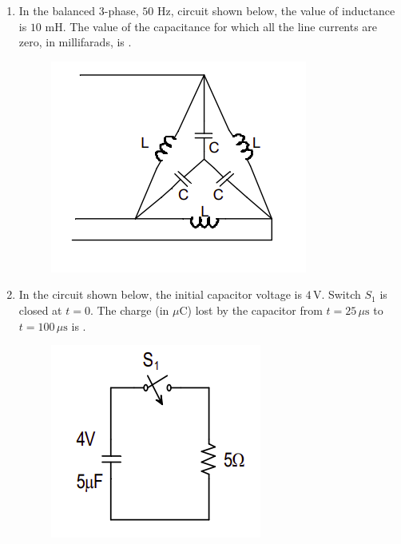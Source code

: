\documentclass[journal,12pt,onecolumn]{IEEEtran}
\theoremstyle{remark}
\begin{document}
\begin{enumerate}[start=1, label=Q.\arabic*]
    \hfill{}

    \item In the balanced 3-phase, $50$ Hz, circuit shown below, the value of inductance  is $10$ mH. The value of the capacitance  for which all the line currents are zero, in millifarads, is \underline{\hspace{2cm}}.
    \begin{figure}[H]
        \includegraphics[width=0.4\columnwidth]{Figures/2q35.png}
        \centering
        \caption{}
    \end{figure}

    \hfill{}

    \item In the circuit shown below, the initial capacitor voltage is $4\,\text{V}$. 
Switch $S_1$ is closed at $t=0$. The charge (in $\mu\text{C}$) lost by the
capacitor from $t=25\,\mu\text{s}$ to $t=100\,\mu\text{s}$ is
\underline{\hspace{2cm}}.
    \begin{figure}[H]
        \includegraphics[width=0.4\columnwidth]{Figures/2q37.png}
        \centering
        \caption{}
    \end{figure}

    \hfill{}


\end{enumerate}
\end{document}
